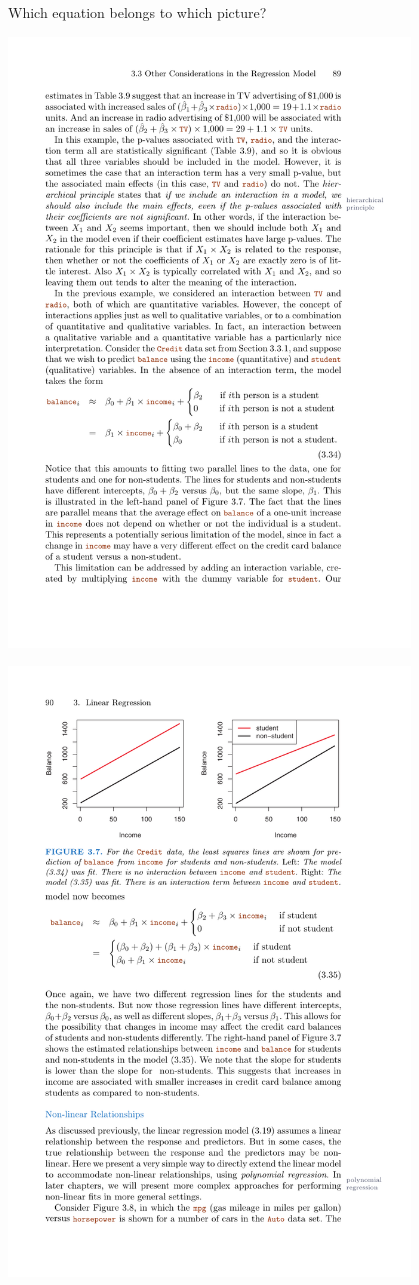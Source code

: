 \documentclass[aspectratio=169]{beamer}
\begin{document}
\begin{frame}{Which equation belongs to which picture?}

\vspace{3mm}
\includegraphics[width=0.8\textwidth]{CreditEqn1}

\includegraphics[width=0.8\textwidth]{CreditEqn2}



\end{frame}
\end{document}
